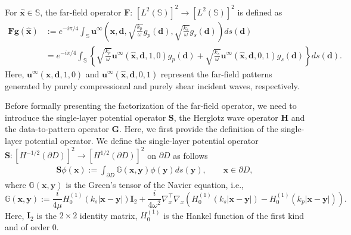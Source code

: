\documentclass[11pt,reqno,twoside]{amsart}
\theoremstyle{definition}
\theoremstyle{remark}
\numberwithin{equation}{section}
\begin{document}
	For $\hat{\mathbf x}\in \mathbb{S}$, the far-field operator $\mathbf{F}$: $\left[L^2\left(\mathbb S\right) \right] ^2 \to \left[L^2\left(\mathbb S\right) \right] ^2$ is defined as
	\begin{equation}\begin{aligned}\label{eq:FarfieldOperator}
		\mathbf{Fg}(\hat{\mathbf x})
		 & :=e^{-i\pi /4} \int_{\mathbb S} \mathbf{u}^{\infty} \left( \hat{\mathbf x}, \mathbf d, \sqrt{\frac{k_p}{\omega}}g_p(\mathbf d),\sqrt{\frac{k_s}{\omega}}g_s(\mathbf d) \right) ds(\mathbf d)\\
		& =e^{-i\pi /4} \int_{\mathbb S}\left\lbrace \sqrt{\frac{k_p}{\omega}}\mathbf{u}^\infty (\hat{\mathbf x},\mathbf d,1,0)g_p(\mathbf d)+\sqrt{\frac{k_s}{\omega}}\mathbf{u}^\infty (\hat{\mathbf x},\mathbf d,0,1)g_s(\mathbf d)\right\rbrace ds(\mathbf d).
	\end{aligned}\end{equation}
    Here, $\mathbf{u}^\infty(\hat{\mathbf{x}},\mathbf{d},1,0)$ and $\mathbf{u}^\infty(\hat{\mathbf{x}},\mathbf{d},0,1)$ represent the far-field patterns generated by purely compressional  and purely shear incident waves, respectively.
	
	Before formally presenting the factorization of the far-field operator, we need to introduce the single-layer potential operator $\mathbf S$, the Herglotz wave operator $\mathbf H$ and the data-to-pattern operator $\mathbf G$. Here, we first provide the definition of the single-layer potential operator. We define the single-layer potential operator $\mathbf{S}:\left[H^{-1/2}\left(\partial D\right) \right] ^2 \to \left[H^{1/2}\left(\partial D\right) \right] ^2$ on $\partial D$ as follows
	\begin{align}\label{eq:SingleLayerOperater}
		\mathbf S \phi \left( \mathbf x\right) :=\int_{\partial D} \mathbb G \left( \mathbf x, \mathbf y\right) \phi\left(\mathbf y\right) ds\left( \mathbf y\right) , \qquad \mathbf x\in \partial D,
	\end{align}
	where $\mathbb G \left( \mathbf x, \mathbf y\right)$ is the Green's tensor of the Navier equation, i.e.,
	$$
	\mathbb G \left( \mathbf x, \mathbf y\right):=\frac{i}{4\mu} H_0^{\left( 1\right) }\left( k_s|\mathbf x -\mathbf y|\right) \mathbf I_2 +\frac{i}{4\omega^2} \nabla_x^{\top} \nabla_x \left( H_0^{\left( 1\right) }\left( k_s|\mathbf x -\mathbf y|\right)-H_0^{\left( 1\right) }\left( k_p|\mathbf x -\mathbf y|\right)\right) .
	$$
	Here, $\mathbf I_2$ is the $2 \times 2$ identity matrix, $H_0^{\left( 1\right) }$ is the Hankel function of the first kind and of order 0.
	
\end{document}

